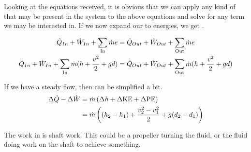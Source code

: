 Looking at the equations received, it is obvious that we can apply any kind of  that may be present in the system to the above equations and solve for any term we may be interested in.
If we now expand our  to energies, we get .

\begin{equation}\label{eq:Energy_Continuity_Equation}
  \begin{aligned}
    \dot{Q}_{In} + \dot{W}_{In} + \sum\limits_{\text{In}} \dot{m} e &= \dot{Q}_{Out} + \dot{W}_{Out} + \sum\limits_{\text{Out}} \dot{m} e \\
    \dot{Q}_{In} + \dot{W}_{In} + \sum\limits_{\text{In}} \dot{m} (h + \frac{v^{2}}{2} + g d) &= \dot{Q}_{Out} + \dot{W}_{Out} + \sum\limits_{\text{Out}} \dot{m} (h + \frac{v^{2}}{2} + g d)
  \end{aligned}
\end{equation}

If we have a steady flow, then  can be simplified a bit.
\begin{equation}\label{eq:Steady_Flow_Energy_Continuity_Equation}
  \begin{aligned}
    \Delta \dot{Q} - \Delta \dot{W} &= \dot{m} \left( \Delta h + \Delta \mathrm{KE} + \Delta \mathrm{PE} \right) \\
    &= \dot{m} \left( (h_{2} - h_{1}) + \frac{v_{2}^{2} - v_{1}^{2}}{2} + g (d_{2} - d_{1}) \right)
  \end{aligned}
\end{equation}

The work in  is shaft work.
This could be a propeller turning the fluid, or the fluid doing work on the shaft to achieve something.

